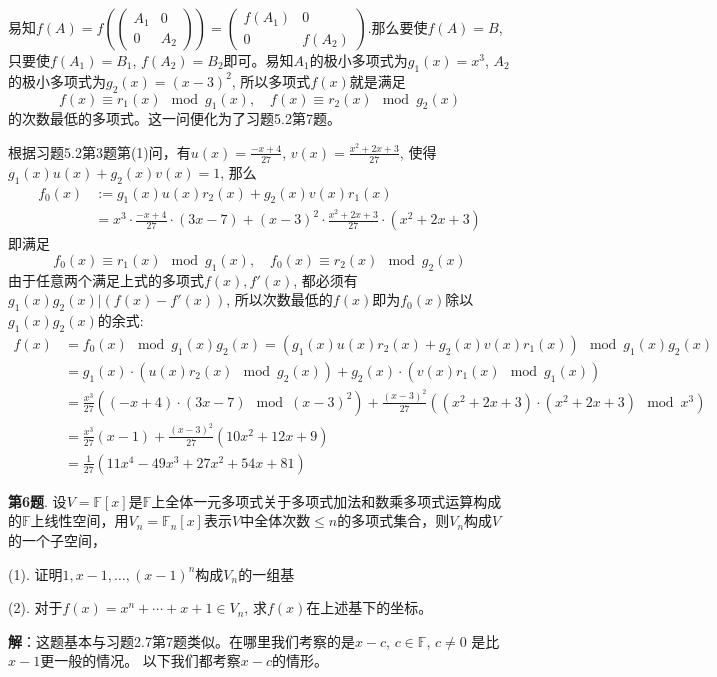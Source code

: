 易知$f(A) = f(\begin{pmatrix} A_1 & 0 \\ 0 & A_2 \end{pmatrix}) = \begin{pmatrix} f(A_1) & 0 \\ 0 & f(A_2) \end{pmatrix}$.那么要使$f(A) = B$, 只要使$f(A_1) = B_1$, $f(A_2) = B_2$即可。易知$A_1$的极小多项式为$g_1(x) = x^3$, $A_2$的极小多项式为$g_2(x) = (x-3)^2$, 所以多项式$f(x)$就是满足
$$f(x) \equiv r_1(x) \mod g_1(x), \quad f(x) \equiv r_2(x) \mod g_2(x)$$
的次数最低的多项式。这一问便化为了习题5.2第7题。

根据习题5.2第3题第(1)问，有$u(x) = \frac{-x+4}{27}$, $v(x) = \frac{x^2+2x+3}{27}$, 使得$g_1(x)u(x) + g_2(x)v(x) = 1$, 那么
\begin{align*}
f_0(x) & := g_1(x)u(x)r_2(x) + g_2(x)v(x)r_1(x) \\
& = x^3 \cdot \frac{-x+4}{27} \cdot (3x-7) + (x-3)^2 \cdot \frac{x^2+2x+3}{27} \cdot (x^2+2x+3)
\end{align*}
即满足
$$f_0(x) \equiv r_1(x) \mod g_1(x), \quad f_0(x) \equiv r_2(x) \mod g_2(x)$$
由于任意两个满足上式的多项式$f(x),f'(x)$, 都必须有$g_1(x)g_2(x) | (f(x)-f'(x))$, 所以次数最低的$f(x)$即为$f_0(x)$除以$g_1(x)g_2(x)$的余式:
\begin{align*}
f(x) & = f_0(x) \mod g_1(x)g_2(x) = (g_1(x)u(x)r_2(x) + g_2(x)v(x)r_1(x)) \mod g_1(x)g_2(x) \\
& = g_1(x) \cdot (u(x)r_2(x) \mod g_2(x)) + g_2(x) \cdot (v(x)r_1(x) \mod g_1(x)) \\
& = \frac{x^3}{27} ( (-x+4) \cdot (3x-7) \mod (x-3)^2) + \frac{(x-3)^2}{27}( (x^2+2x+3) \cdot (x^2+2x+3) \mod x^3) \\
& = \frac{x^3}{27} (x-1) + \frac{(x-3)^2}{27}(10x^2+12x+9) \\
& = \frac{1}{27}(11x^4 - 49x^3 + 27x^2 + 54x + 81)
\end{align*}

\newpageorvspace


{\bf 第6题}. 设$V = \mathbb{F}[x]$是$\mathbb{F}$上全体一元多项式关于多项式加法和数乘多项式运算构成的$\mathbb{F}$上线性空间，用$V_n = \mathbb{F}_n[x]$表示$V$中全体次数$\leqslant n$的多项式集合，则$V_n$构成$V$的一个子空间，

(1). 证明$1, x-1, \ldots, (x-1)^n$构成$V_n$的一组基

(2). 对于$f(x) = x^n + \cdots + x + 1 \in V_n$, 求$f(x)$在上述基下的坐标。

{\bf 解}：这题基本与习题2.7第7题类似。在哪里我们考察的是$x-c$, $c\in\mathbb{F}$, $c\neq 0$ 是比$x-1$更一般的情况。 以下我们都考察$x-c$的情形。

